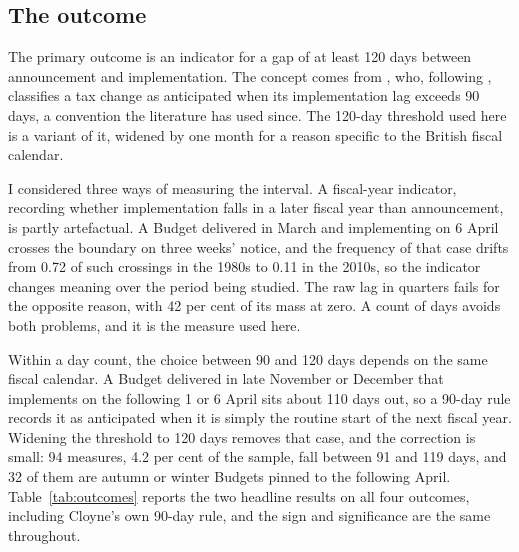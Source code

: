 \documentclass[11pt,a4paper]{article}
\begin{document}
\subsection{The outcome}

The primary outcome is an indicator for a gap of at least 120 days between announcement and
implementation. The concept comes from \citet{cloyne2013}, who, following \citet{mertens2012},
classifies a tax change as anticipated when its implementation lag exceeds 90 days, a convention the
literature has used since. The 120-day threshold used here is a variant of it,
widened by one month for a reason specific to the British fiscal calendar.

I considered three ways of measuring the interval. A fiscal-year indicator, recording whether implementation falls in a later fiscal year than announcement, is partly artefactual. A Budget delivered in March and implementing on 6 April crosses the boundary on three weeks' notice, and the frequency of that case drifts from 0.72 of such crossings in the 1980s to 0.11 in the 2010s, so the indicator changes meaning over the period being studied. The raw lag in quarters fails for the opposite reason, with 42 per cent of its mass at zero. A count of days avoids both problems, and it is the measure used here.

Within a day count, the choice between 90 and 120 days depends on the same fiscal calendar. A Budget
delivered in late November or December that implements on the following 1 or 6 April sits about 110
days out, so a 90-day rule records it as anticipated when it is simply the routine start of the next fiscal year. Widening the threshold to 120 days removes that case, and the correction is small: 94 measures, 4.2 per cent of the sample, fall between 91 and 119 days, and 32 of them are
autumn or winter Budgets pinned to the following April. Table~\ref{tab:outcomes} reports the two
headline results on all four outcomes, including Cloyne's own 90-day rule, and the sign and
significance are the same throughout.
\end{document}

